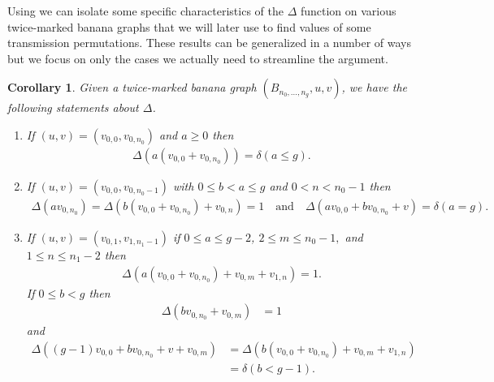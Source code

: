 \documentclass[11pt]{article}
\newtheorem{coro}[theo]{Corollary}
\theoremstyle{definition}
\numberwithin{equation}{section}
\begin{document}
Using  we can isolate some specific characteristics of the $\Delta$ function on various twice-marked banana graphs that we will later use to find values of some transmission permutations. These results can be generalized in a number of ways but we focus on only the cases we actually need to streamline the argument.
\begin{coro}\label{cor-BananaDeltaComps}
    Given a twice-marked banana graph $(B_{n_0,\dots,n_g},u,v)$, we have the following statements about $\Delta$.
    \begin{enumerate}[label = \arabic*)]
        \item If $(u,v) = (v_{0,0},v_{0,n_0})$ and $a \geq 0$ then 
        \begin{align*}
            \Delta(a(v_{0,0}+v_{0,n_0})) = \delta(a\leq g).
        \end{align*}
        \item If $(u,v) = (v_{0,0},v_{0,n_0-1})$ with $0\leq b <a \leq g$ and $0<n<n_0-1$ then
        \begin{align*}
            \Delta(av_{0,n_0}) = \Delta(b(v_{0,0}+v_{0,n_0}) + v_{0,n}) = 1 \quad \text{and} \quad \Delta(av_{0,0}+bv_{0,n_0}+v) = \delta(a = g).
        \end{align*}
        \item If $(u,v) = (v_{0,1},v_{1,n_1-1})$ if $0\leq a\leq g-2$, $2\leq m \leq n_0-1,$ and $1 \leq n \leq n_1-2$ then
        \begin{align*}
            \Delta(a(v_{0,0}+v_{0,n_0})+v_{0,m}+v_{1,n}) = 1.
        \end{align*}
        If $0 \leq b <g$ then
        \begin{align*}
            \Delta(bv_{0,n_0}+v_{0,m}) &= 1
        \end{align*} 
        and
        \begin{align*}\Delta((g-1)v_{0,0}+bv_{0,n_0}+v+v_{0,m}) &= \Delta(b(v_{0,0}+v_{0,n_0})+v_{0,m}+v_{1,n})\\&=\delta(b < g-1).
        \end{align*}
    \end{enumerate}
\end{coro}
\end{document}
